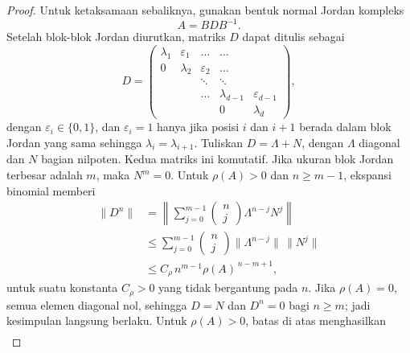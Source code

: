 \begin{proof}
    Untuk ketaksamaan sebaliknya, gunakan bentuk normal Jordan kompleks
    \begin{equation}
        A=BDB^{-1}.
    \end{equation}
    Setelah blok-blok Jordan diurutkan, matriks \(D\) dapat ditulis sebagai
    \begin{equation}
        D=\begin{pmatrix}
            \lambda_1&\varepsilon_1&\dots&\dots&\\
            0&\lambda_2&\varepsilon_2&\dots&\\
            &&\ddots&\ddots&\\
            &&\dots&\lambda_{d-1}&\varepsilon_{d-1}\\
            &&&0&\lambda_d
        \end{pmatrix},
    \end{equation}
    dengan \(\varepsilon_i\in\{0,1\}\), dan \(\varepsilon_i=1\) hanya jika posisi \(i\) dan \(i+1\) berada dalam blok Jordan yang sama sehingga \(\lambda_i=\lambda_{i+1}\). Tuliskan \(D=\Lambda+N\), dengan \(\Lambda\) diagonal dan \(N\) bagian nilpoten. Kedua matriks ini komutatif. Jika ukuran blok Jordan terbesar adalah \(m\), maka \(N^m=0\). Untuk \(\rho(A)>0\) dan \(n\geq m-1\), ekspansi binomial memberi
    \begin{equation}
        \begin{aligned}
            \|D^n\|
            &=\left\|\sum_{j=0}^{m-1}
            \begin{pmatrix}
                n\\
                j
            \end{pmatrix}\Lambda^{n-j}N^j\right\|\\
            &\leq\sum_{j=0}^{m-1}
            \begin{pmatrix}
                n\\
                j
            \end{pmatrix}\|\Lambda^{n-j}\|\,\|N^j\|\\
            &\leq C_{\rho}\,n^{m-1}\rho(A)^{\,n-m+1},
        \end{aligned}
    \end{equation}
    untuk suatu konstanta \(C_{\rho}>0\) yang tidak bergantung pada \(n\). Jika \(\rho(A)=0\), semua elemen diagonal nol, sehingga \(D=N\) dan \(D^n=0\) bagi \(n\geq m\); jadi kesimpulan langsung berlaku. Untuk \(\rho(A)>0\), batas di atas menghasilkan
    \begin{equation}
        \begin{aligned}

\end{aligned}
\end{equation}
\end{proof}
